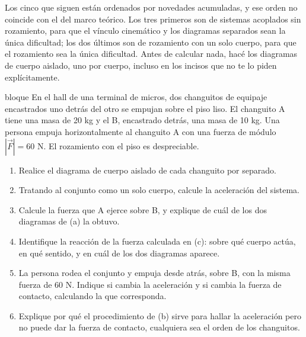 \documentclass[11pt,openany]{book}
\begin{document}
Los cinco que siguen están ordenados por novedades acumuladas, y ese orden no coincide con el del marco teórico. Los tres primeros son de sistemas acoplados sin rozamiento, para que el vínculo cinemático y los diagramas separados sean la única dificultad; los dos últimos son de rozamiento con un solo cuerpo, para que el rozamiento sea la única dificultad. Antes de calcular nada, hacé los diagramas de cuerpo aislado, uno por cuerpo, incluso en los incisos que no te lo piden explícitamente.

\begin{ejercicio}{bloque}
En el hall de una terminal de micros, dos changuitos de equipaje encastrados uno detrás del otro se empujan sobre el piso liso. El changuito A tiene una masa de 20 kg y el B, encastrado detrás, una masa de 10 kg. Una persona empuja horizontalmente al changuito A con una fuerza de módulo $|\vec F| = 60$ N. El rozamiento con el piso es despreciable.
\begin{enumerate}[label=(\alph*), leftmargin=1.7em, itemsep=1pt, topsep=3pt]
  \item Realice el diagrama de cuerpo aislado de cada changuito por separado.
  \item Tratando al conjunto como un solo cuerpo, calcule la aceleración del sistema.
  \item Calcule la fuerza que A ejerce sobre B, y explique de cuál de los dos diagramas de (a) la obtuvo.
  \item Identifique la reacción de la fuerza calculada en (c): sobre qué cuerpo actúa, en qué sentido, y en cuál de los dos diagramas aparece.
  \item La persona rodea el conjunto y empuja desde atrás, sobre B, con la misma fuerza de 60 N. Indique si cambia la aceleración y si cambia la fuerza de contacto, calculando la que corresponda.
  \item Explique por qué el procedimiento de (b) sirve para hallar la aceleración pero no puede dar la fuerza de contacto, cualquiera sea el orden de los changuitos.
\end{enumerate}
\end{ejercicio}
\end{document}
